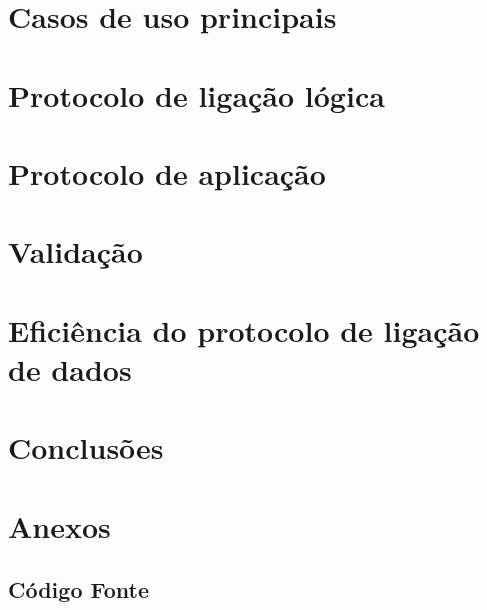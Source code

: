 \documentclass[a4paper,11pt,portuguese]{article}
\begin{document}


\section{Casos de uso principais}



\section{Protocolo de ligação lógica}



\section{Protocolo de aplicação}



\section{Validação}



\section{Eficiência do protocolo de ligação de dados}



\section{Conclusões}



\newpage

\section{Anexos}
\subsection{Código Fonte}












\end{document}
